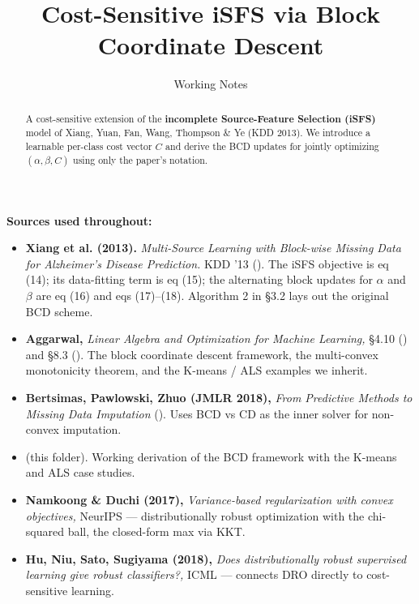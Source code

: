 \documentclass[11pt,a4paper]{article}
\title{Cost-Sensitive iSFS via Block Coordinate Descent}
\author{Working Notes}
\date{}
\begin{document}
\maketitle
\thispagestyle{empty}

\begin{abstract}
\noindent A cost-sensitive extension of the \textbf{incomplete Source-Feature Selection (iSFS)} model of Xiang, Yuan, Fan, Wang, Thompson \& Ye (KDD 2013). We introduce a learnable per-class cost vector $C$ and derive the BCD updates for jointly optimizing $(\alpha, \beta, C)$ using only the paper's notation.
\end{abstract}

\bigskip
\noindent\textbf{Sources used throughout:}
\begin{itemize}[leftmargin=*,itemsep=4pt]
  \item \textbf{Xiang et al. (2013).} \emph{Multi-Source Learning with Block-wise Missing Data for Alzheimer's Disease Prediction.} KDD '13 (). The iSFS objective is eq (14); its data-fitting term is eq (15); the alternating block updates for $\alpha$ and $\beta$ are eq (16) and eqs (17)--(18). Algorithm 2 in \S 3.2 lays out the original BCD scheme.
  \item \textbf{Aggarwal,} \emph{Linear Algebra and Optimization for Machine Learning,} \S 4.10 () and \S 8.3 (). The block coordinate descent framework, the multi-convex monotonicity theorem, and the K-means / ALS examples we inherit.
  \item \textbf{Bertsimas, Pawlowski, Zhuo (JMLR 2018),} \emph{From Predictive Methods to Missing Data Imputation} (). Uses BCD vs CD as the inner solver for non-convex imputation.
  \item \textbf{} (this folder). Working derivation of the BCD framework with the K-means and ALS case studies.
  \item \textbf{Namkoong \& Duchi (2017),} \emph{Variance-based regularization with convex objectives,} NeurIPS --- distributionally robust optimization with the chi-squared ball, the closed-form max via KKT.
  \item \textbf{Hu, Niu, Sato, Sugiyama (2018),} \emph{Does distributionally robust supervised learning give robust classifiers?,} ICML --- connects DRO directly to cost-sensitive learning.
\end{itemize}

\newpage
\tableofcontents
\newpage
\end{document}
